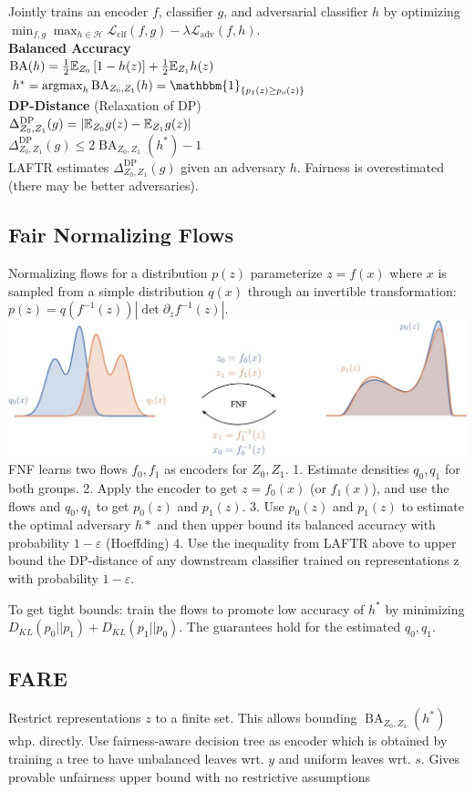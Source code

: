 Jointly trains an encoder $f$, classifier $g$, and adversarial classifier $h$ by optimizing\\
$\min_{f,g}\max_{h\in\mathcal{H}} \mathcal{L}_{\text{clf}}(f,g)-\lambda \mathcal{L}_{\text{adv}}(f,h)$.\\
\textbf{Balanced Accuracy}\\
$\operatorname{BA}(h)=\frac{1}{2}\mathbb{E}_{Z_0}\left[1-h(z)\right]+\frac{1}{2}\mathbb{E}_{Z_1}h(z)$\\
$h^*=\argmax_h\operatorname{BA}_{Z_0,Z_1}(h)=\mathbbm{1}_{\{p_1(z)\geq p_o(z)\}}$\\
\textbf{DP-Distance} (Relaxation of DP)\\
$\Delta^{\text{DP}}_{Z_0,Z_1}(g)=\left|\mathbb{E}_{Z_0}g(z)-\mathbb{E}_{Z_1}g(z)\right|$\\
$\Delta^{\text{DP}}_{Z_0,Z_1}(g)\leq2\operatorname{BA}_{Z_0,Z_1}(h^*)-1$\\
LAFTR estimates $\Delta^{\text{DP}}_{Z_0,Z_1}(g)$ given an adversary $h$. Fairness is overestimated (there may be better adversaries).

\subsection*{Fair Normalizing Flows}
Normalizing flows for a distribution $p(z)$ parameterize $z=f(x)$ where $x$ is sampled from a simple distribution $q(x)$ through an invertible transformation: $p(z)=q(f^{-1}(z))\left|\det{\partial_z f^{-1}}(z)\right|.$\\
\includegraphics[width=1\columnwidth]{img/fnf.png}
FNF learns two flows $f_0,f_1$ as encoders for $Z_0,Z_1$. 1. Estimate densities $q_0, q_1$ for both groups. 2. Apply the encoder to get $z=f_0(x)$ (or $f_1(x)$), and use the flows and $q_0,q_1$ to get $p_0(z)$ and $p_1(z)$. 3. Use $p_0(z)$ and $p_1(z)$ to estimate the optimal adversary $h*$ and then upper bound its balanced accuracy with probability $1-\varepsilon$ (Hoeffding) 4. Use the inequality from LAFTR above to upper bound the DP-distance of any downstream classifier trained on representations z with probability $1-\varepsilon$.

To get tight bounds: train the flows to promote low accuracy of $h^*$ by minimizing $D_{KL}(p_0||p_1)+D_{KL}(p_1||p_0)$. \Warning The guarantees hold for the estimated $q_0,q_1$.

\subsection*{FARE}
Restrict representations $z$ to a finite set. This allows bounding $\operatorname{BA}_{Z_0,Z_1}(h^*)$ whp. directly. Use fairness-aware decision tree as encoder which is obtained by training a tree to have unbalanced leaves wrt. $y$ and uniform leaves wrt. $s$. Gives provable unfairness upper bound with no restrictive assumptions